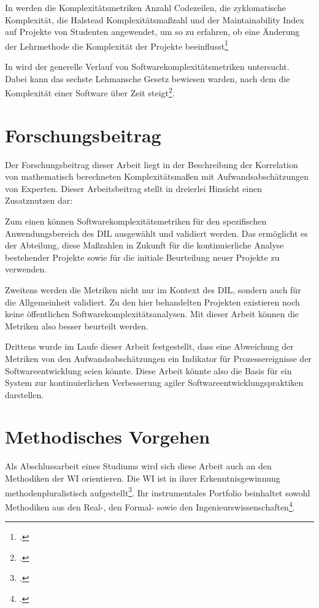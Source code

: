 In \cite[][]{rumreichExaminingSoftwareDesign2019} werden die Komplexitätsmetriken
Anzahl Codezeilen, die zyklomatische Komplexität, die Halstead
Komplexitätsmaßzahl und der Maintainability Index auf Projekte von
Studenten angewendet, um so zu erfahren, ob eine Änderung der
Lehrmethode die Komplexität der Projekte beeinflusst\footcite[Vgl. ][S. 1]{rumreichExaminingSoftwareDesign2019}

In \cite[][]{aleneziEmpiricalAnalysisComplexity2015} wird der generelle Verlauf von
Softwarekomplexitätsmetriken untersucht. Dabei kann das sechste
Lehmansche Gesetz bewiesen warden, nach dem die Komplexität einer
Software über Zeit steigt\footcite[Vgl. ][S. 262]{aleneziEmpiricalAnalysisComplexity2015}.

\section{Forschungsbeitrag}\label{forschungsbeitrag}

Der Forschungsbeitrag dieser Arbeit liegt in der Beschreibung der
Korrelation von mathematisch berechneten Komplexitätsmaßen mit
Aufwandsabschätzungen von Experten. Dieser Arbeitsbeitrag stellt in
dreierlei Hinsicht einen Zusatznutzen dar:

Zum einen können Softwarekomplexitätsmetriken für den spezifischen
Anwendungsbereich des DIL ausgewählt und validiert werden. Das
ermöglicht es der Abteilung, diese Maßzahlen in Zukunft für die
kontinuierliche Analyse bestehender Projekte sowie für die initiale
Beurteilung neuer Projekte zu verwenden.

Zweitens werden die Metriken nicht nur im Kontext des DIL, sondern auch
für die Allgemeinheit validiert. Zu den hier behandelten Projekten
existieren noch keine öffentlichen Softwarekomplexitätsanalysen. Mit
dieser Arbeit können die Metriken also besser beurteilt werden.

Drittens wurde im Laufe dieser Arbeit festgestellt, dass eine Abweichung
der Metriken von den Aufwandsabschätzungen ein Indikator für
Prozessereignisse der Softwareentwicklung seien könnte. Diese Arbeit
könnte also die Basis für ein System zur kontinuierlichen Verbesserung
agiler Softwareentwicklungspraktiken darstellen.

\section{Methodisches Vorgehen}\label{methodisches-vorgehen}

Als Abschlussarbeit eines Studiums wird sich
diese Arbeit auch an den Methodiken der \ac{WI} orientieren. Die \ac{WI} ist in
ihrer Erkenntnisgewinnung methodenpluralistisch aufgestellt\footcite[Vgl. ][S. 1]{wildeMethodenspektrumWirtschaftsinformatikUberblick2006}. Ihr instrumentales Portfolio beinhaltet
sowohl Methodiken aus den Real-, den Formal- sowie den
Ingenieurswissenschaften\footcite[Vgl. ][S. 1]{wildeMethodenspektrumWirtschaftsinformatikUberblick2006}.

